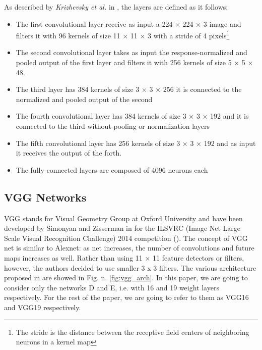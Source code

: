 As described by \textit{Krizhevsky et al.} in \cite{NIPS2012_c399862d}, the layers are defined as it follows:

\begin{itemize}
\item The first convolutional layer receive as input a 224 × 224 × 3  image and filters it with 96 kernels of size 11 × 11 × 3 with a stride of 4 pixels\footnote{The stride is the distance between the receptive field centers of neighboring neurons in a kernel map}
\item The second convolutional layer takes as input the response-normalized and pooled output of the first layer and filters it with 256 kernels of size 5 × 5 × 48.
\item The third layer has 384 kernels of size 3 × 3 × 256 it is connected to the normalized and pooled output of the second
\item The fourth convolutional layer has 384 kernels of size 3 × 3 × 192 and it is connected to the third without pooling or normalization layers
\item The fifth convolutional layer has 256 kernels of size 3 × 3 × 192 and as input it receives the output of the forth. 
\item The fully-connected layers are composed of 4096 neurons each
\end{itemize}
\subsection{VGG Networks}\label{sec:VGG}
VGG stands for Visual Geometry Group at Oxford University and have been developed by Simonyan and Zisserman in \cite{simonyan2015deep} for the 
ILSVRC (Image Net Large Scale Visual Recognition Challenge) 2014 competition
(\cite{DBLP:journals/corr/RussakovskyDSKSMHKKBBF14}). 
The concept of VGG net is similar to Alexnet: as net increases, the number of convolutions and future maps increases as well. Rather than using 11 × 11 feature detectors or filters, however, the authors decided to use smaller 3 x 3  filters. The various architecture proposed in \cite{simonyan2015deep} are showed in Fig. n. \ref{fig:vgg_arch}. In this paper, we are going to consider only the networks D and E, i.e. with 16 and 19 weight layers respectively. For the rest of the paper, we are going to refer to them as VGG16 and VGG19 respectively. 


